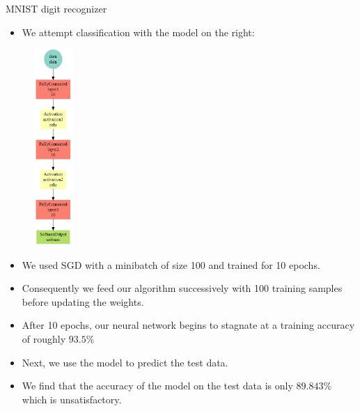 \begin{vbframe}{MNIST digit recognizer}
\framebreak
  \begin{minipage}{0.45\textwidth}
    \begin{itemize}
      \item We attempt classification with the model on the right:
    \end{itemize}
  \end{minipage}
  \begin{minipage}{0.45\textwidth}
    \begin{figure}
      \centering
        \includegraphics[width=1.5cm]{plots/mxnet_codechunk_4b.png}
    \end{figure}
  \end{minipage}



\framebreak
  \begin{itemize}
    \item We used SGD with a minibatch of size 100 and trained for 10 epochs.
    \item Consequently we feed our algorithm successively with 100 training samples before updating the weights.
    \item After 10 epochs, our neural network begins to stagnate at a training accuracy of roughly $93.5\%$
    \item Next, we use the model to predict the test data.
    \item We find that the accuracy of the model on the test data is only $89.843\%$ which is unsatisfactory. 
  \end{itemize}
  

\end{vbframe}
